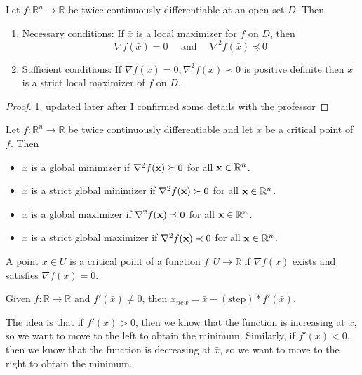 \begin{theorem}
  Let $f: \mathbb R^n \to \mathbb R$ be twice continuously differentiable at an open set $D$. Then
  \begin{enumerate}
    \item Necessary conditions: If $\bar{x}$ is a local maximizer for $f$ on $D$, then $$\nabla f(\bar{x})=0 \quad \text{ and } \quad \nabla^2f(\bar{x}) \preceq 0
    $$
    \item Sufficient conditions: If $\nabla f(\bar{x})=0,\nabla^2f(\bar{x}) \prec 0$ is positive definite then $\bar{x}$ is a strict local maximizer of $f$ on $D$.
  \end{enumerate}
\end{theorem}
\begin{proof}
    1. updated later after I confirmed some details with the professor
\end{proof}
\begin{theorem}[]
  Let $f: \mathbb R^n \to \mathbb R$ be twice continuously differentiable and let $\bar{x}$ be a critical point of $f$. Then
  \begin{itemize}
    \item $\bar x$ is a global minimizer if $\nabla^2 f(\textbf{x}) \succeq 0$ for all $\textbf{x} \in \mathbb R^n$.
    \item $\bar x$ is a strict global minimizer if $\nabla^2 f(\textbf{x}) \succ 0$ for all $\textbf{x} \in \mathbb R^n$.
    \item $\bar x$ is a global maximizer if $\nabla^2 f(\textbf{x}) \preceq 0$ for all $\textbf{x} \in \mathbb R^n$.
    \item $\bar x$ is a strict global maximizer if $\nabla^2 f(\textbf{x}) \prec 0$ for all $\textbf{x} \in \mathbb R^n$.
  \end{itemize}
\end{theorem}

\begin{definition}
    A point $\bar x \in U$ is a critical point of a function $f: U \rightarrow \mathbb R$ if $\nabla f(\bar x)$ exists and satisfies $\nabla f(\bar x) = 0$.
\end{definition}

\begin{problem}
    Given $f: \mathbb{R}\rightarrow \mathbb{R}$ and $f'(\bar{x})\neq 0$, then $x_{new}=\bar{x}-(\text{step})*f'(\bar{x})$.
    
    The idea is that if $f'(\bar x) > 0$, then we know that the function is increasing at $\bar x$, so we want to move to the left to obtain the minimum. Similarly, if $f'(\bar x) < 0$, then we know that the function is decreasing at $\bar x$, so we want to move to the right to obtain the minimum.
\end{problem}

